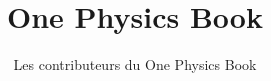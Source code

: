 \documentclass[11pt,a4paper,twoside,openany]{book}
\title{One Physics Book}
\author{Les contributeurs du One Physics Book}
\date{\bookdate}
\begin{document}
\frontmatter



\tableofcontents

\mainmatter





\appendix
\part{\omsolutionspart}




\backmatter
\printindex
\end{document}
